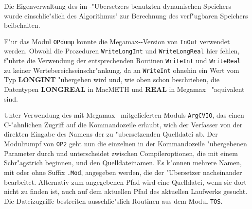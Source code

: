 Die Eigenverwaltung des im \oberon-"Ubersetzers benutzten dynamischen
Speichers wurde ein\-schlie"s\-lich des Algorithmus' zur Berechnung des
verf"ugbaren Speichers beibehalten.

\medskip
F"ur das Modul {\tt OPdump} konnte die Megamax-\modula-Version von {\tt InOut}
verwendet werden.
Obwohl die Prozeduren {\tt WriteLongInt} und {\tt WriteLongReal} hier fehlen,
f"uhrte die Verwendung der entsprechenden Routinen {\tt WriteInt} und
{\tt WriteReal} zu keiner Wertebereichseinschr"ankung, da an {\tt WriteInt}
ohnehin ein Wert vom Typ {\bf LONGINT} "ubergeben wird und, wie oben schon
beschrieben, die Datentypen {\bf LONGREAL} in MacMETH und {\bf REAL} in
Megamax \modula\ "aquivalent sind.

\medskip
Unter Verwendung des mit Megamax \modula\ mitgelieferten Moduls {\tt ArgCVIO},
das einen C-"ahnlichen Zugriff auf die Kommandozeile erlaubt,
wich der Verfasser von der direkten Eingabe des Namens der zu "ubersetzenden
Quelldatei ab.
Der Modulrumpf von {\tt OP2} geht nun die einzelnen in der Kommandozeile
"ubergebenen Parameter durch und unterscheidet zwischen Compileroptionen,
die mit einem Schr"agstrich beginnen, und den Quelldateinamen.
Es k"onnen mehrere Namen, mit oder ohne Suffix  {\tt .Mod}, angegeben werden,
die der "Ubersetzer nacheinander bearbeitet.
Alternativ zum angegebenen Pfad wird eine Quelldatei, wenn sie dort nicht
zu finden ist, auch auf dem aktuellen Pfad des aktuellen Laufwerks gesucht.
Die Dateizugriffe bestreiten ausschlie"slich Routinen aus dem Modul {\tt TOS}.

